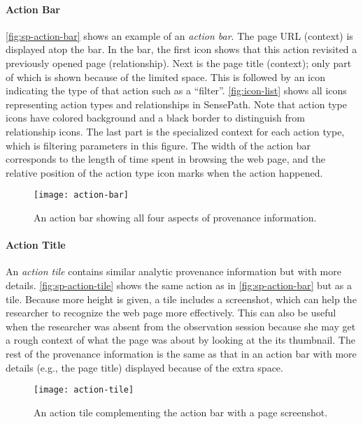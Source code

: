 \paragraph{Action Bar}
\autoref{fig:sp-action-bar} shows an example of an \textit{action bar}. The page URL (context) is displayed atop the bar. In the bar, the first icon shows that this action revisited a previously opened page (relationship). Next is the page title (context); only part of which is shown because of the limited space. This is followed by an icon indicating the type of that action such as a ``filter''. \autoref{fig:icon-list} shows all icons representing action types and relationships in SensePath. Note that action type icons have colored background and a black border to distinguish from relationship icons. The last part is the specialized context for each action type, which is filtering parameters in this figure. The width of the action bar corresponds to the length of time spent in browsing the web page, and the relative position of the action type icon marks when the action happened.

\begin{figure}[!htb]
\centering
\texttt{[image: action-bar]}
\caption{An action bar showing all four aspects of provenance information.}
\label{fig:sp-action-bar}
\end{figure}

\paragraph{Action Title}
An \emph{action tile} contains similar analytic provenance information but with more details. \autoref{fig:sp-action-tile} shows the same action as in \autoref{fig:sp-action-bar} but as a tile. Because more height is given, a tile includes a screenshot, which can help the researcher to recognize the web page more effectively. This can also be useful when the researcher was absent from the observation session because she may get a rough context of what the page was about by looking at the its thumbnail. The rest of the provenance information is the same as that in an action bar with more details (e.g., the page title) displayed because of the extra space.

\begin{figure}[!htb]
\centering
\texttt{[image: action-tile]}
\caption{An action tile complementing the action bar with a page screenshot.}
\label{fig:sp-action-tile}
\end{figure}

